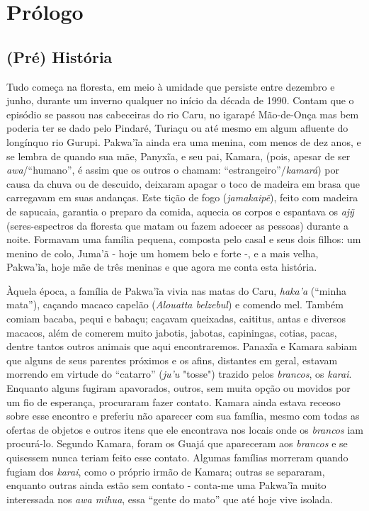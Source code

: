 \hypertarget{pruxf3logo}{%
\section{Prólogo}\label{pruxf3logo}}

\hypertarget{pruxe9-histuxf3ria}{%
\subsection{ (Pré) História}\label{pruxe9-histuxf3ria}}

Tudo começa na floresta, em meio à umidade que persiste entre dezembro e
junho, durante um inverno qualquer no início da década de 1990. Contam
que o episódio se passou nas cabeceiras do rio Caru, no igarapé
Mão-de-Onça mas bem poderia ter se dado pelo Pindaré, Turiaçu ou até
mesmo em algum afluente do longínquo rio Gurupi. Pakwa'ĩa ainda era uma
menina, com menos de dez anos, e se lembra de quando sua mãe, Panyxĩa, e
seu pai, Kamara, (pois, apesar de ser \emph{awa}/``humano'', é assim que
os outros o chamam: ``estrangeiro''/\emph{kamará}) por causa da chuva ou
de descuido, deixaram apagar o toco de madeira em brasa que carregavam
em suas andanças. Este tição de fogo (\emph{jamakaipẽ}), feito com
madeira de sapucaia, garantia o preparo da comida, aquecia os corpos e
espantava os \emph{ajỹ} (seres-espectros da floresta que matam ou fazem
adoecer as pessoas) durante a noite. Formavam uma família pequena,
composta pelo casal e seus dois filhos: um menino de colo, Juma'ã - hoje
um homem belo e forte -, e a mais velha, Pakwa'ĩa, hoje mãe de três
meninas e que agora me conta esta história.

Àquela época, a família de Pakwa'ĩa vivia nas matas do Caru,
\emph{haka'a} (``minha mata''), caçando macaco capelão (\emph{Alouatta
belzebul}) e comendo mel. Também comiam bacaba, pequi e babaçu; caçavam
queixadas, caititus, antas e diversos macacos, além de comerem muito
jabotis, jabotas, capiningas, cotias, pacas, dentre tantos outros
animais que aqui encontraremos. Panaxĩa e Kamara sabiam que alguns de
seus parentes próximos e os afins, distantes em geral, estavam morrendo
em virtude do ``catarro'' (\emph{ju'u} "tosse") trazido pelos
\emph{brancos}, os \emph{karai}. Enquanto alguns fugiram apavorados,
outros, sem muita opção ou movidos por um fio de esperança, procuraram
fazer contato. Kamara ainda estava receoso sobre esse encontro e
preferiu não aparecer com sua família, mesmo com todas as ofertas de
objetos e outros itens que ele encontrava nos locais onde os
\emph{brancos} iam procurá-lo. Segundo Kamara, foram os Guajá que
apareceram aos \emph{brancos} e se quisessem nunca teriam feito esse
contato. Algumas famílias morreram quando fugiam dos \emph{karai}, como
o próprio irmão de Kamara; outras se separaram, enquanto outras ainda
estão sem contato - conta-me uma Pakwa'ĩa muito interessada nos
\emph{awa mihua}, essa ``gente do mato'' que até hoje vive isolada.

